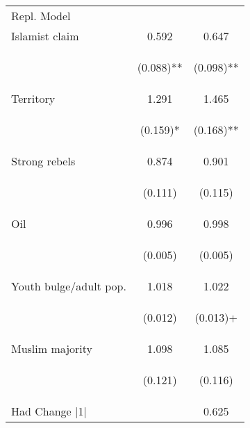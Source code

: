 \begin{center}
\begin{tabular}{lcc}
\hline \noalign{\smallskip}Repl. Model &  & \\
\noalign{\smallskip}\hline \noalign{\smallskip}Islamist claim & 0.592 & 0.647\\
 & \begin{footnotesize}(0.088)**\end{footnotesize} & \begin{footnotesize}(0.098)**\end{footnotesize}\\
\noalign{\smallskip}Territory & 1.291 & 1.465\\
 & \begin{footnotesize}(0.159)*\end{footnotesize} & \begin{footnotesize}(0.168)**\end{footnotesize}\\
\noalign{\smallskip}Strong rebels & 0.874 & 0.901\\
 & \begin{footnotesize}(0.111)\end{footnotesize} & \begin{footnotesize}(0.115)\end{footnotesize}\\
\noalign{\smallskip}Oil & 0.996 & 0.998\\
 & \begin{footnotesize}(0.005)\end{footnotesize} & \begin{footnotesize}(0.005)\end{footnotesize}\\
\noalign{\smallskip}Youth bulge/adult pop. & 1.018 & 1.022\\
 & \begin{footnotesize}(0.012)\end{footnotesize} & \begin{footnotesize}(0.013)+\end{footnotesize}\\
\noalign{\smallskip}Muslim majority & 1.098 & 1.085\\
 & \begin{footnotesize}(0.121)\end{footnotesize} & \begin{footnotesize}(0.116)\end{footnotesize}\\
\noalign{\smallskip}Had Change |1| &  & 0.625\\

\end{tabular}
\end{center}
